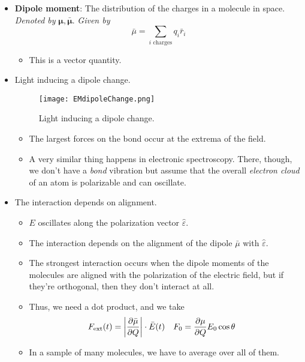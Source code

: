 \documentclass[../notes.tex]{subfiles}
\begin{document}
\begin{itemize}
\begin{itemize}
\begin{itemize}
        \end{itemize}
    \end{itemize}
    \item \textbf{Dipole moment}: The distribution of the charges in a molecule in space. \emph{Denoted by} $\bm{\mu},\bm{\bar{\mu}}$. \emph{Given by}
    \begin{equation*}
        \bar{\mu} = \sum_{i\text{ charges}}q_i\bar{r}_i
    \end{equation*}
    \begin{itemize}
        \item This is a vector quantity.
    \end{itemize}
    \item Light inducing a dipole change.
    \begin{figure}[H]
        \centering
        \texttt{[image: EMdipoleChange.png]}
        \caption{Light inducing a dipole change.}
        \label{fig:EMdipoleChange}
    \end{figure}
    \begin{itemize}
        \item The largest forces on the bond occur at the extrema of the field.
        \item A very similar thing happens in electronic spectroscopy. There, though, we don't have a \emph{bond} vibration but assume that the overall \emph{electron cloud} of an atom is polarizable and can oscillate.
    \end{itemize}
    \item The interaction depends on alignment.
    \begin{itemize}
        \item $E$ oscillates along the polarization vector $\hat{\varepsilon}$.
        \item The interaction depends on the alignment of the dipole $\bar{\mu}$ with $\hat{\varepsilon}$.
        \item The strongest interaction occurs when the dipole moments of the molecules are aligned with the polarization of the electric field, but if they're orthogonal, then they don't interact at all.
        \item Thus, we need a dot product, and we take
        \begin{align*}
            F_\text{ext}(t) &= \left| \pdv{\bar{\mu}}{Q} \right|\cdot\bar{E}(t)&
            F_0 &= \pdv{\mu}{Q}E_0\cos\theta
        \end{align*}
        \item In a sample of many molecules, we have to average over all of them.

\end{itemize}
\end{itemize}
\end{document}
